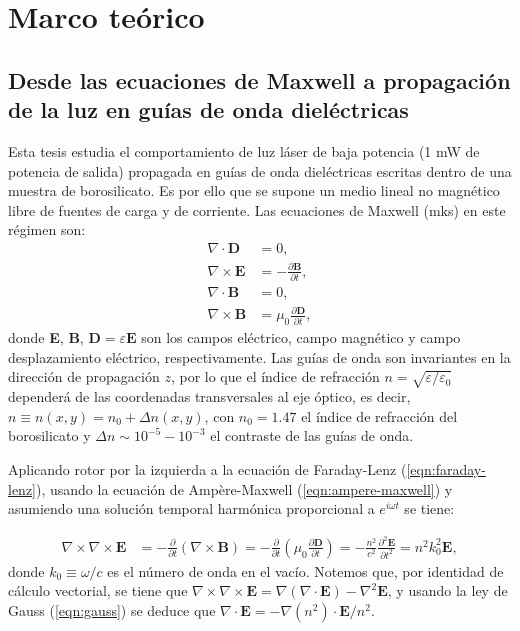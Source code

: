 \chapter{Marco teórico}

\section{Desde las ecuaciones de Maxwell a propagación de la luz en guías de onda dieléctricas}

Esta tesis estudia el comportamiento de luz láser de baja potencia (1 mW de potencia de salida) propagada en guías de onda dieléctricas escritas dentro de una muestra de borosilicato. Es por ello que se supone un medio lineal no magnético libre de fuentes de carga y de corriente. Las ecuaciones de Maxwell (mks) en este régimen son:
\begin{align}
	\nabla\cdot\textbf{D} &= 0, \label{eqn:gauss}
	\\	
	\nabla\times\textbf{E} &= -\frac{\partial \textbf{B}}{\partial t}, \label{eqn:faraday-lenz}
	\\	
	\nabla\cdot\textbf{B} &= 0,
	\\	
	\nabla\times\textbf{B} &= \mu_0\frac{\partial \textbf{D}}{\partial t}, \label{eqn:ampere-maxwell}
\end{align}
donde \textbf{E}, \textbf{B}, $\textbf{D}=\varepsilon\textbf{E}$ son los campos eléctrico, campo magnético y campo desplazamiento eléctrico, respectivamente. Las guías de onda son invariantes en la dirección de propagación $z$, por lo que el índice de refracción $n=\sqrt{\varepsilon/\varepsilon_0}$ dependerá de las coordenadas transversales al eje óptico, es decir, $n \equiv n(x,y) = n_0 + \Delta n(x,y)$, con $n_0=1.47$ el índice de refracción del borosilicato y $\Delta n \sim 10^{-5}-10^{-3}$ el contraste de las guías de onda.

Aplicando rotor por la izquierda a la ecuación de Faraday-Lenz (\ref{eqn:faraday-lenz}), usando la ecuación de Ampère-Maxwell (\ref{eqn:ampere-maxwell}) y asumiendo una solución temporal harmónica proporcional a $e^{i\omega t}$ se tiene:

\begin{align}
	\nabla\times\nabla\times\textbf{E} &= -\frac{\partial}{\partial t}(\nabla\times\textbf{B}) = -\frac{\partial}{\partial t}\left(\mu_0\frac{\partial \textbf{D}}{\partial t}\right) = -\frac{n^2}{c^2}\frac{\partial^2 \textbf{E}}{\partial t^2} = n^2k_0^2 \textbf{E}, \label{eqn:rotordoble}
\end{align}
donde $k_0 \equiv \omega/c$ es el número de onda en el vacío. Notemos que, por identidad de cálculo vectorial, se tiene que $\nabla\times\nabla\times\textbf{E} = \nabla(\nabla\cdot\textbf{E}) - \nabla^2\textbf{E}$, y usando la ley de Gauss (\ref{eqn:gauss}) se deduce que $\nabla\cdot \textbf{E} = -\nabla(n^2)\cdot\textbf{E}/n^2$.

